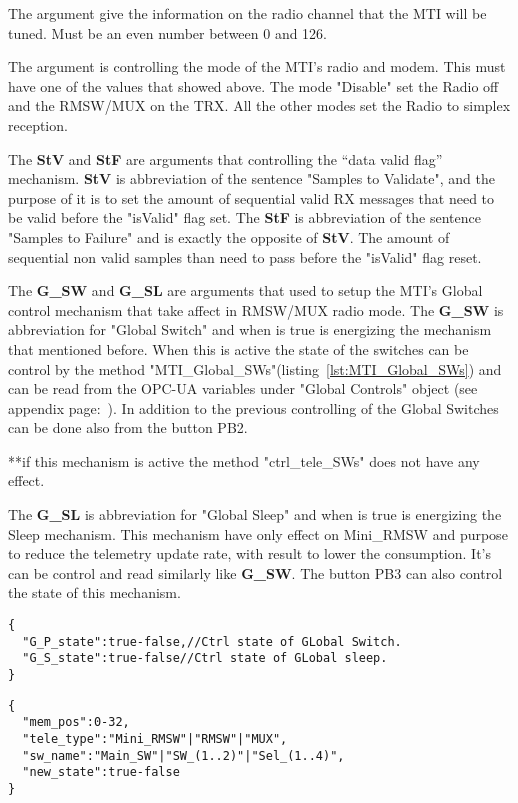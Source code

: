 The  argument give the information on the radio channel that the MTI will be tuned. Must be an even number between 0 and 126.

The  argument is controlling the mode of the MTI's radio and modem. This must have one of the values that showed above. The mode "Disable"
set the Radio off and the RMSW/MUX on the TRX. All the other modes set the Radio to simplex reception.

The \textbf{StV} and \textbf{StF} are arguments that controlling the ``data valid flag'' mechanism. \textbf{StV} is abbreviation of the sentence "Samples to Validate",
and the purpose of it is to set the amount of sequential valid RX messages that need to be valid before the "isValid" flag set.
The \textbf{StF} is abbreviation of the sentence "Samples to Failure" and is exactly the opposite of \textbf{StV}.
The amount of sequential non valid samples than need to pass before the "isValid" flag reset.

The \textbf{G\_SW} and \textbf{G\_SL} are arguments that used to setup the MTI's Global control mechanism that take affect in RMSW/MUX radio mode.
The \textbf{G\_SW} is abbreviation for "Global Switch" and when is true is energizing the mechanism that mentioned before.
When this is active the state of the switches can be control by the method "MTI\_Global\_SWs"(listing~\ref{lst:MTI_Global_SWs}) and can be read from the OPC-UA variables under "Global Controls" object (see appendix page:~\pageref{tree:RMSW/MUX}).
In addition to the previous controlling of the Global Switches can be done also from the button PB2.

**if this mechanism is active the method "ctrl\_tele\_SWs" does not have any effect.

The \textbf{G\_SL} is abbreviation for "Global Sleep" and when is true is energizing the Sleep mechanism. This mechanism have only effect on Mini\_RMSW and purpose to reduce the
telemetry update rate, with result to lower the consumption. It's can be control and read similarly like \textbf{G\_SW}. The button PB3 can also control the state of this mechanism.
\newpage
\begin{lstlisting}[frame=single,caption=Argument for MTI\_Global\_SWs(), label=lst:MTI_Global_SWs]
{
  "G_P_state":true-false,//Ctrl state of GLobal Switch.
  "G_S_state":true-false//Ctrl state of GLobal sleep.
}
\end{lstlisting}

\begin{lstlisting}[frame=single,caption=Argument for ctrl\_tele\_SWs(), label=lst:ctrl_tele_SWs]
{
  "mem_pos":0-32,
  "tele_type":"Mini_RMSW"|"RMSW"|"MUX",
  "sw_name":"Main_SW"|"SW_(1..2)"|"Sel_(1..4)",
  "new_state":true-false
}
\end{lstlisting}

